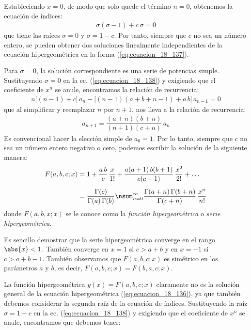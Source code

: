 Estableciendo $x = 0$, de modo que solo quede el término $n = 0$, obtenemos la ecuación de índices:
\begin{align*}
\sigma (\sigma - 1) + c \, \sigma = 0
\end{align*}
que tiene las raíces $\sigma = 0$ y $\sigma = 1 - c$. Por tanto, siempre que $c$ no sea un número entero, se pueden obtener dos soluciones linealmente independientes de la ecuación hipergeométrica en la forma (\ref{eq:ecuacion_18_137}).
\par
Para $\sigma = 0$, la solución correspondiente es una serie de potencias simple. Sustituyendo $\sigma = 0$ en la ec. (\ref{eq:ecuacion_18_138}) y exigiendo que el coeficiente de $x^{n}$ se anule, encontramos la relación de recurrencia:
\begin{align}
n \big[ (n - 1) + c \big] \, a_{n} - \big[ (n - 1)(a + b + n - 1) + a \, b \big] \, a_{n-1} = 0
\label{eq:ecuacion_18_139}
\end{align}
que al simplificar y reemplazar $n$ por $n + 1$, nos lleva a la relación de recurrencia:
\begin{align}
a_{n+1} = \dfrac{(a + n)(b + n)}{(n + 1)(c + n)} \, a_{n}
\label{eq:ecuacion_18_140}
\end{align}
Es convencional hacer la elección simple de $a_{0} = 1$. Por lo tanto, siempre que $c$ no sea un número entero negativo o cero, podemos escribir la solución de la siguiente manera:
\begin{align}
F(a, b, c; x) &= 1 + \dfrac{a \, b}{c} \, \dfrac{x}{1!} +  \dfrac{a (a + 1)\, b (b + 1)}{c (c + 1)} \, \dfrac{x^{2}}{2!} + \ldots \label{eq:ecuacion_18_141} \\[0.5em]
&= \dfrac{\Gamma (c)}{\Gamma (a) \, \Gamma (b)} \nsum_{n=0}^{\infty} \dfrac{\Gamma (a + n) \, \Gamma (b + n)}{\Gamma (c + n)} \, \dfrac{x^{n}}{n!} \label{eq:ecuacion_18_142}
\end{align}
donde $F(a, b, x; x)$ se le conoce como la \emph{función hipergeométrica} o \emph{serie hipergeométrica}.
\par
Es sencillo demostrar que la serie hipergeométrica converge en el rango $\abs{x} < 1$. También converge en $x = 1$ si $ c > a + b$ y en $x = -1$ si $c > a + b - 1$. También observamos que $F (a, b, c; x)$ es simétrico en los parámetros $a$ y $b$, es decir, $F (a, b, c; x) = F (b, a, c; x)$.
\par
La función hipergeométrica $y (x) = F (a, b, c; x)$ claramente no es la solución general de la ecuación hipergeométrica (\ref{eq:ecuacion_18_136}), ya que también debemos considerar la segunda raíz de la ecuación de índices. Sustituyendo la raíz $\sigma = 1 - c$ en la ec.  (\ref{eq:ecuacion_18_138}) y exigiendo que el coeficiente de $x^{n}$ se anule, encontramos que debemos tener:
